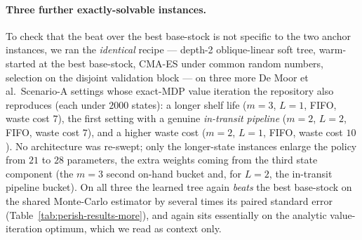 \documentclass[11pt]{article}
\begin{document}
\paragraph{Three further exactly-solvable instances.}
To check that the beat over the best base-stock is not specific to the two anchor instances, we ran the
\emph{identical} recipe --- depth-2 oblique-linear soft tree, warm-started at the best
base-stock, CMA-ES under common random numbers, selection on the disjoint validation
block --- on three more De Moor et al.\ Scenario-A settings whose exact-MDP value iteration
the repository also reproduces (each under $2000$ states): a longer shelf life ($m=3$,
$L=1$, FIFO, waste cost $7$), the first setting with a genuine \emph{in-transit pipeline}
($m=2$, $L=2$, FIFO, waste cost $7$), and a higher waste cost ($m=2$, $L=1$, FIFO, waste
cost $10$). No architecture was re-swept; only the longer-state instances enlarge the policy
from $21$ to $28$ parameters, the extra weights coming from the third state component (the
$m=3$ second on-hand bucket and, for $L=2$, the in-transit pipeline bucket). On all three the
learned tree again \emph{beats} the best base-stock on the shared Monte-Carlo estimator
by several times its paired standard error (Table~\ref{tab:perish-results-more}), and again
sits essentially on the analytic value-iteration optimum, which we read as context only.
\end{document}
